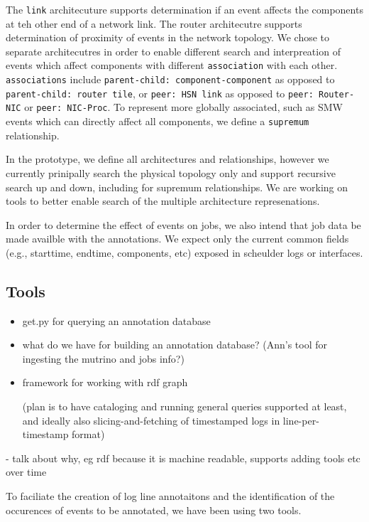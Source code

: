 The \texttt{link} architecuture supports determination if an event affects the
components at teh other end of a network link. The router architecutre
supports determination of proximity of events in the network topology.
We chose to separate architecutres in order to enable different
search and interpreation of events which affect components with
different \texttt{association} with each other. \texttt{associations}
include \texttt{parent-child: component-component} as opposed to
\texttt{parent-child: router tile}, or \texttt{peer: HSN link}
as opposed to \texttt{peer: Router-NIC} or \texttt{peer: NIC-Proc}.
To represent more globally associated, such as SMW
events which can directly affect all components, we define
a \texttt{supremum} relationship.

In the prototype, we define all architectures and relationships,
however we currently prinipally search the physical topology only
and support recursive search up and down, including for supremum
relationships. We are working on tools to better enable search of
the multiple architecture represenations.

In order to determine the effect of events on jobs, we also
intend that job data be made availble with the annotations.
We expect only the current common fields (e.g., starttime,
endtime, components, etc) exposed in scheulder logs or
interfaces.



\subsection{Tools}
\begin{itemize}
\item get.py for querying an annotation database
\item what do we have for building an annotation database? (Ann's tool for ingesting the mutrino and jobs info?)
\item framework for working with rdf graph

(plan is to have cataloging and running general queries supported at least, and ideally also slicing-and-fetching of timestamped logs in line-per-timestamp format)
\end{itemize}


- talk about why, eg rdf because it is machine readable, supports adding tools etc over time 


To faciliate the creation of log line annotaitons
and the identification of the occurences of events to be annotated,
we have been using two tools.

